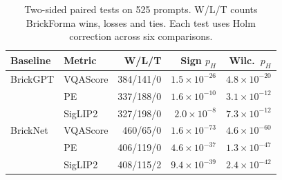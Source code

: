 \begin{table}[t]
\centering\small
\setlength{\tabcolsep}{3pt}
\begin{tabular}{llrrr}
\toprule
Baseline & Metric & W/L/T & Sign $p_H$ & Wilc.\ $p_H$ \\
\midrule
BrickGPT & VQAScore & 384/141/0 & $1.5\times 10^{-26}$ & $4.8\times 10^{-20}$ \\
 & PE & 337/188/0 & $1.6\times 10^{-10}$ & $3.1\times 10^{-12}$ \\
 & SigLIP2 & 327/198/0 & $2.0\times 10^{-8}$ & $7.3\times 10^{-12}$ \\
BrickNet & VQAScore & 460/65/0 & $1.6\times 10^{-73}$ & $4.6\times 10^{-60}$ \\
 & PE & 406/119/0 & $4.6\times 10^{-37}$ & $1.3\times 10^{-47}$ \\
 & SigLIP2 & 408/115/2 & $9.4\times 10^{-39}$ & $2.4\times 10^{-42}$ \\
\bottomrule
\end{tabular}
\caption{Two-sided paired tests on 525 prompts. W/L/T counts BrickForma wins, losses and ties. Each test uses Holm correction across six comparisons.}
\label{tab:sig}
\end{table}
